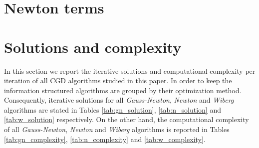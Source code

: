\section{Newton terms}
\label{sec:app1}

\section{Solutions and complexity}
\label{sec:app2}

In this section we report the iterative solutions and computational complexity per iteration of all CGD algorithms studied in this paper. In order to keep the information structured algorithms are grouped by their optimization method. Consequently, iterative solutions for all \emph{Gauss-Newton}, \emph{Newton} and \emph{Wiberg} algorithms are stated in Tables \ref{tab:gn_solution}, \ref{tab:n_solution} and \ref{tab:w_solution} respectively. On the other hand, the computational complexity of all \emph{Gauss-Newton}, \emph{Newton} and \emph{Wiberg} algorithms is reported in Tables \ref{tab:gn_complexity}, \ref{tab:n_complexity} and \ref{tab:w_complexity}.



